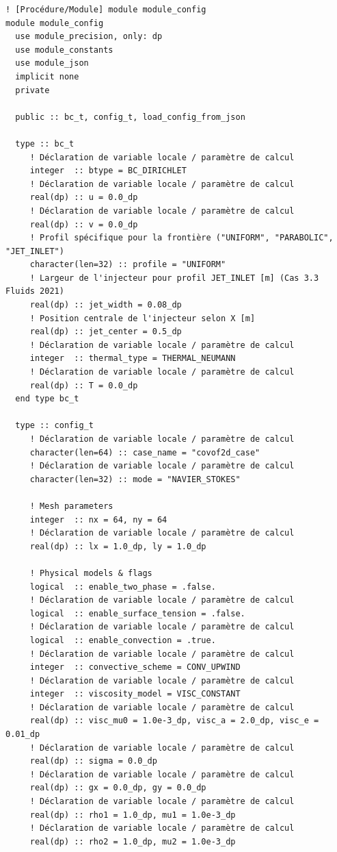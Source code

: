 \documentclass[10pt,a4paper,oneside]{book}
\begin{document}
\begin{lstlisting}[language={[95]Fortran}]
! [Procédure/Module] module module_config
module module_config
  use module_precision, only: dp
  use module_constants
  use module_json
  implicit none
  private

  public :: bc_t, config_t, load_config_from_json

  type :: bc_t
     ! Déclaration de variable locale / paramètre de calcul
     integer  :: btype = BC_DIRICHLET
     ! Déclaration de variable locale / paramètre de calcul
     real(dp) :: u = 0.0_dp
     ! Déclaration de variable locale / paramètre de calcul
     real(dp) :: v = 0.0_dp
     ! Profil spécifique pour la frontière ("UNIFORM", "PARABOLIC", "JET_INLET")
     character(len=32) :: profile = "UNIFORM"
     ! Largeur de l'injecteur pour profil JET_INLET [m] (Cas 3.3 Fluids 2021)
     real(dp) :: jet_width = 0.08_dp
     ! Position centrale de l'injecteur selon X [m]
     real(dp) :: jet_center = 0.5_dp
     ! Déclaration de variable locale / paramètre de calcul
     integer  :: thermal_type = THERMAL_NEUMANN
     ! Déclaration de variable locale / paramètre de calcul
     real(dp) :: T = 0.0_dp
  end type bc_t

  type :: config_t
     ! Déclaration de variable locale / paramètre de calcul
     character(len=64) :: case_name = "covof2d_case"
     ! Déclaration de variable locale / paramètre de calcul
     character(len=32) :: mode = "NAVIER_STOKES"

     ! Mesh parameters
     integer  :: nx = 64, ny = 64
     ! Déclaration de variable locale / paramètre de calcul
     real(dp) :: lx = 1.0_dp, ly = 1.0_dp

     ! Physical models & flags
     logical  :: enable_two_phase = .false.
     ! Déclaration de variable locale / paramètre de calcul
     logical  :: enable_surface_tension = .false.
     ! Déclaration de variable locale / paramètre de calcul
     logical  :: enable_convection = .true.
     ! Déclaration de variable locale / paramètre de calcul
     integer  :: convective_scheme = CONV_UPWIND
     ! Déclaration de variable locale / paramètre de calcul
     integer  :: viscosity_model = VISC_CONSTANT
     ! Déclaration de variable locale / paramètre de calcul
     real(dp) :: visc_mu0 = 1.0e-3_dp, visc_a = 2.0_dp, visc_e = 0.01_dp
     ! Déclaration de variable locale / paramètre de calcul
     real(dp) :: sigma = 0.0_dp
     ! Déclaration de variable locale / paramètre de calcul
     real(dp) :: gx = 0.0_dp, gy = 0.0_dp
     ! Déclaration de variable locale / paramètre de calcul
     real(dp) :: rho1 = 1.0_dp, mu1 = 1.0e-3_dp
     ! Déclaration de variable locale / paramètre de calcul
     real(dp) :: rho2 = 1.0_dp, mu2 = 1.0e-3_dp


\end{lstlisting}
\end{document}
